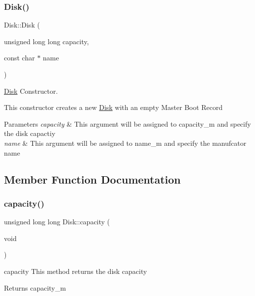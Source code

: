 \subsubsection{\texorpdfstring{Disk()}{Disk()}\hspace{0.1cm}{\footnotesize\ttfamily [4/4]}}
{\footnotesize\ttfamily Disk\+::\+Disk (\begin{DoxyParamCaption}\item[{unsigned long long}]{capacity,  }\item[{const char $\ast$}]{name }\end{DoxyParamCaption})}



\mbox{\hyperlink{classcore_1_1disk_1_1_disk}{Disk}} Constructor. 

This constructor creates a new \mbox{\hyperlink{classcore_1_1disk_1_1_disk}{Disk}} with an empty Master Boot Record 
\begin{DoxyParams}{Parameters}
{\em capacity} & This argument will be assigned to capacity\+\_\+m and specify the disk capactiy \\
\hline
{\em name} & This argument will be assigned to name\+\_\+m and specify the manufcator name \\
\hline
\end{DoxyParams}


\subsection{Member Function Documentation}
\mbox{\label{classcore_1_1disk_1_1_disk_a4f0d7b0ab94fb0ed0a58bb19ce85729f}} 
\subsubsection{\texorpdfstring{capacity()}{capacity()}}
{\footnotesize\ttfamily unsigned long long Disk\+::capacity (\begin{DoxyParamCaption}\item[{void}]{ }\end{DoxyParamCaption})}



capacity This method returns the disk capacity 

\begin{DoxyReturn}{Returns}
capacity\+\_\+m 
\end{DoxyReturn}
\mbox{\label{classcore_1_1disk_1_1_disk_ac3ed02b2b44d2d15039d3616238c0985}} 
